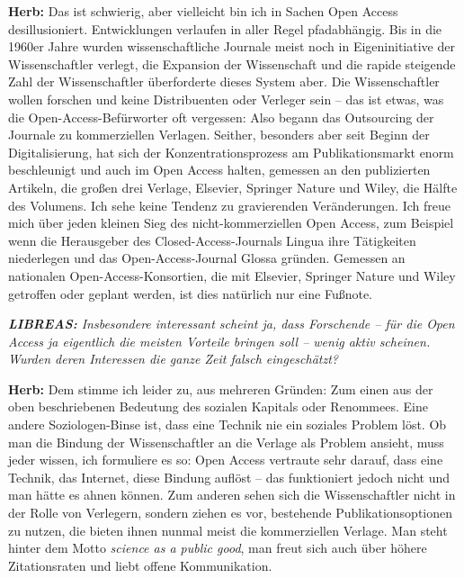 \documentclass[a4paper,
fontsize=11pt,
oneside,
numbers=noperiodatend,
parskip=half-,
bibliography=totoc,
final
]{scrartcl}
\begin{document}
\textbf{Herb:} Das ist schwierig, aber vielleicht bin ich in Sachen Open
Access desillusioniert. Entwicklungen verlaufen in aller Regel
pfadabhängig. Bis in die 1960er Jahre wurden wissenschaftliche Journale
meist noch in Eigeninitiative der Wissenschaftler verlegt, die Expansion
der Wissenschaft und die rapide steigende Zahl der Wissenschaftler
überforderte dieses System aber. Die Wissenschaftler wollen forschen und
keine Distribuenten oder Verleger sein -- das ist etwas, was die
Open-Access-Befürworter oft vergessen: Also begann das Outsourcing der
Journale zu kommerziellen Verlagen. Seither, besonders aber seit Beginn
der Digitalisierung, hat sich der Konzentrationsprozess am
Publikationsmarkt enorm beschleunigt und auch im Open Access halten,
gemessen an den publizierten Artikeln, die großen drei Verlage,
Elsevier, Springer Nature und Wiley, die Hälfte des Volumens. Ich sehe
keine Tendenz zu gravierenden Veränderungen. Ich freue mich über jeden
kleinen Sieg des nicht-kommerziellen Open Access, zum Beispiel wenn die
Herausgeber des Closed-Access-Journals Lingua ihre Tätigkeiten
niederlegen und das Open-Access-Journal Glossa gründen. Gemessen an
nationalen Open-Access-Konsortien, die mit Elsevier, Springer Nature und
Wiley getroffen oder geplant werden, ist dies natürlich nur eine
Fußnote.

\emph{\textbf{LIBREAS:} Insbesondere interessant scheint ja, dass
Forschende -- für die Open Access ja eigentlich die meisten Vorteile
bringen soll -- wenig aktiv scheinen. Wurden deren Interessen die ganze
Zeit falsch eingeschätzt?}

\textbf{Herb:} Dem stimme ich leider zu, aus mehreren Gründen: Zum einen
aus der oben beschriebenen Bedeutung des sozialen Kapitals oder
Renommees. Eine andere Soziologen-Binse ist, dass eine Technik nie ein
soziales Problem löst. Ob man die Bindung der Wissenschaftler an die
Verlage als Problem ansieht, muss jeder wissen, ich formuliere es so:
Open Access vertraute sehr darauf, dass eine Technik, das Internet,
diese Bindung auflöst -- das funktioniert jedoch nicht und man hätte es
ahnen können. Zum anderen sehen sich die Wissenschaftler nicht in der
Rolle von Verlegern, sondern ziehen es vor, bestehende
Publikationsoptionen zu nutzen, die bieten ihnen nunmal meist die
kommerziellen Verlage. Man steht hinter dem Motto \emph{science as a
public good}, man freut sich auch über höhere Zitationsraten und liebt
offene Kommunikation.
\end{document}
